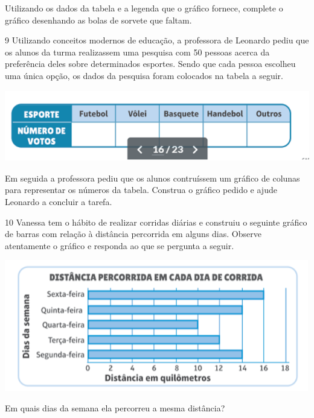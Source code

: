 \begin{mdframed}[linewidth=2pt,linecolor=salmao,roundcorner=2pt]
\begin{escolha}
{Utilizando os dados da tabela e a legenda que o gráfico fornece,
complete o gráfico desenhando as bolas de sorvete que faltam.


\num{9} Utilizando conceitos modernos de educação, a professora de Leonardo
pediu que os alunos da turma realizassem uma pesquisa com 50 pessoas acerca da
preferência deles sobre determinados esportes. Sendo que cada pessoa
escolheu uma única opção, os dados da pesquisa foram colocados na tabela
a seguir.

\includegraphics[width=5.39213in,height=1.22511in]{media/image102.png}

Em seguida a professora pediu que os alunos contruíssem um gráfico de
colunas para representar os números da tabela. Construa o gráfico pedido
e ajude Leonardo a concluir a tarefa.

\begin{mdframed}[linewidth=2pt,linecolor=salmao,roundcorner=2pt]
\vspace{10cm}
\end{mdframed}

\num{10} Vanessa tem o hábito de realizar corridas diárias e construiu o seguinte
gráfico de barras com relação à distância percorrida em alguns dias. Observe atentamente o gráfico e responda ao que se pergunta a seguir.

\includegraphics[width=5.22545in,height=2.25853in]{media/image103.png}

\begin{escolha}
\item
  Em quais dias da semana ela percorreu a mesma distância?


\end{escolha}}
\end{escolha}
\end{mdframed}
